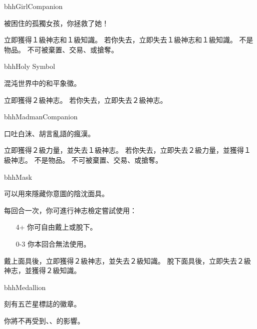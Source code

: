 \linebreak[0]%
\begin{OmenCard}{bhh}{Girl}{Companion}
  \begin{CardStory}
    被困住的孤獨女孩，你拯救了她！
  \end{CardStory}
  立即獲得１級神志和１級知識。\smallbreak
  若你失去\ThisName{}，立即失去１級神志和１級知識。\smallbreak
  \ThisName{}不是物品。\smallbreak
  \ThisName{}不可被棄置、交易、或搶奪。\smallbreak
\end{OmenCard}%
\linebreak[0]%
\begin{OmenCard}{bhh}{Holy Symbol}{}
  \begin{CardStory}
    混沌世界中的和平象徵。
  \end{CardStory}
  立即獲得２級神志。\smallbreak
  若你失去\ThisName{}，立即失去２級神志。\smallbreak
\end{OmenCard}%
\linebreak[0]%
\begin{OmenCard}{bhh}{Madman}{Companion}
  \begin{CardStory}
    口吐白沫、胡言亂語的瘋漢。
  \end{CardStory}
  立即獲得２級力量，並失去１級神志。\smallbreak
  若你失去\ThisName{}，立即失去２級力量，並獲得１級神志。\smallbreak
  \ThisName{}不是物品。\smallbreak
  \ThisName{}不可被棄置、交易、或搶奪。\smallbreak
\end{OmenCard}%
\linebreak[0]%
\begin{OmenCard}{bhh}{Mask}{}
  \begin{CardStory}
    可以用來隱藏你意圖的陰沈面具。
  \end{CardStory}
  每回合一次，你可進行神志檢定嘗試使用\ThisName{}：
  \begin{itemize}
    \item[4+] 你可自由戴上或脫下\ThisName{}。
    \item[0-3] 你本回合無法使用\ThisName{}。
  \end{itemize}
  戴上面具後，立即獲得２級神志，並失去２級知識。\smallbreak
  脫下面具後，立即失去２級神志，並獲得２級知識。\smallbreak
\end{OmenCard}%
\linebreak[0]%
\begin{OmenCard}{bhh}{Medallion}{}
  \begin{CardStory}
    刻有五芒星標誌的徽章。
  \end{CardStory}
  你將不再受到、、的影響。\smallbreak
\end{OmenCard}%
